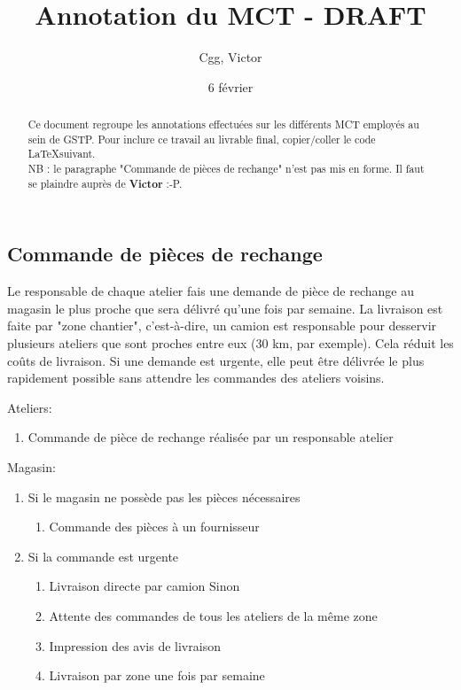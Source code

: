\documentclass[a4paper]{article}
\title{Annotation du MCT - DRAFT}
\author{Cgg, Victor}
\date{6 février}
\begin{document}
\maketitle

\begin{abstract}
Ce document regroupe les annotations effectuées sur les différents MCT
employés au sein de GSTP. Pour inclure ce travail au livrable final,
copier/coller le code \LaTeX suivant.\\
NB : le paragraphe "Commande de pièces de rechange" n'est pas mis en forme.
Il faut se plaindre auprès de \textbf{Victor} :-P.
\end{abstract}

\subsection{Commande de pièces de rechange}

Le responsable de chaque atelier fais une demande de pièce de rechange au
magasin le plus proche que sera délivré qu'une fois par semaine.  La
livraison est faite par "zone chantier", c'est-à-dire, un camion est
responsable pour desservir plusieurs ateliers que sont proches entre eux
(30 km, par exemple). Cela réduit les coûts de livraison.
Si une demande est urgente, elle peut être délivrée le plus rapidement
possible sans attendre les commandes des ateliers voisins.

Ateliers:
\begin{enumerate}
    \item Commande de pièce de rechange réalisée par un responsable atelier
\end{enumerate}

Magasin:
\begin{enumerate}
    \item Si le magasin ne possède pas les pièces nécessaires
    \begin{enumerate}
        \item Commande des pièces à un fournisseur
    \end{enumerate}

    \item Si la commande est urgente
    \begin{enumerate}
        \itemImpression d'un avis de livraison
        (document utilisé pour confirmé la livraison)
        \item Livraison directe par camion
        Sinon
        \item Attente des commandes de tous les ateliers de la même zone
        \item Impression des avis de livraison
        \item Livraison par zone une fois par semaine
    \end{enumerate}
\end{enumerate}
\end{document}
